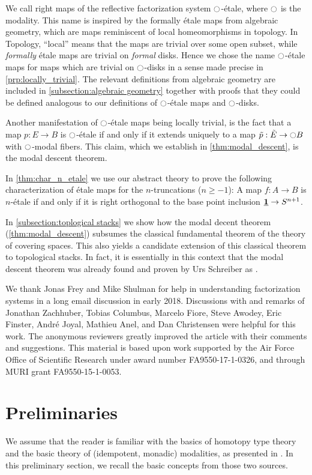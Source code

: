 \documentclass[9pt,twosided]{amsart}
\begin{document}
We call right maps of the reflective factorization system ${\ocircle}$-étale, where ${\ocircle}$ is the modality.
This name is inspired by the formally étale maps from algebraic geometry,
which are maps reminiscent of local homeomorphisms in topology.
In Topology, ``local'' means that the maps are trivial over some open subset, while \emph{formally} étale maps are trivial on \emph{formal} disks.
Hence we chose the name ${\ocircle}$-étale maps for maps which are trivial on ${\ocircle}$-disks in a sense made precise in \cref{prp:locally_trivial}.
The relevant definitions from algebraic geometry are included in \ref{subsection:algebraic geometry}
together with proofs that they could be defined analogous to our definitions of ${\ocircle}$-étale maps and ${\ocircle}$-disks.

Another manifestation of ${\ocircle}$-\'etale maps being locally trivial, is the fact that a map $p:E\to B$ is ${\ocircle}$-\'etale if and only if it extends uniquely to a map $\tilde{p}:\tilde{E}\to {\ensuremath{\ocircle}} B$ with ${\ocircle}$-modal fibers. This claim, which we establish in \cref{thm:modal_descent}, is the modal descent theorem. 

In \cref{thm:char_n_etale} we use our abstract theory to prove the following characterization of étale maps for the $n$-truncations ($n\geq -1$):
A map $f:A\to B$ is $n$-\'etale if and only if it is right orthogonal to the base point inclusion $\underline{\mathbf{1}}\to S^{n+1}$.

In \cref{subsection:toplogical stacks} we show how the modal decent theorem (\cref{thm:modal_descent})
subsumes the classical fundamental theorem of the theory of covering spaces.
This also yields a candidate extension of this classical theorem to topological stacks.
In fact, it is essentially in this context that the modal descent theorem was already found and proven by Urs Schreiber as \cite[Proposition 5.2.42]{SchreiberDcct}.
  
We thank Jonas Frey and Mike Shulman for help in understanding factorization systems in a long email discussion in early 2018.
Discussions with and remarks of Jonathan Zachhuber, Tobias Columbus, Marcelo Fiore, Steve Awodey, Eric Finster, André Joyal, Mathieu Anel, and Dan Christensen were helpful for this work.
The anonymous reviewers greatly improved the article with their comments and suggestions. 
This material is based upon work supported by the Air Force Office of Scientific Research under award number FA9550-17-1-0326, and through MURI grant FA9550-15-1-0053.


\section{Preliminaries}
We assume that the reader is familiar with the basics of homotopy type theory \cite{UFP} and the basic theory of (idempotent, monadic) modalities, as presented in \cite{RijkeSpittersShulman}. In this preliminary section, we recall the basic concepts from those two sources.
\end{document}
